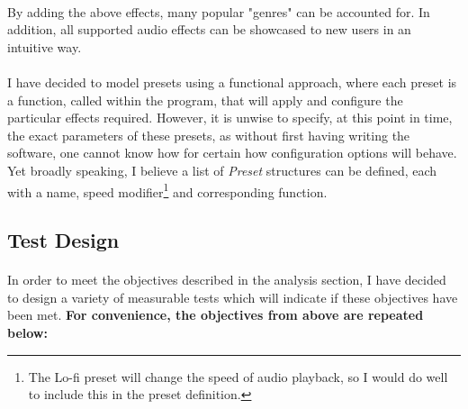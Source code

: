 \paragraph{}
By adding the above effects, many popular "genres" can be accounted for. In addition, all supported audio effects can be showcased to new users in an intuitive way.

\paragraph{}
I have decided to model presets using a functional approach, where each preset is a function, called within the program, that will apply and configure the particular effects required. However, it is unwise to specify, at this point in time, the exact parameters of these presets, as without first having writing the software, one cannot know how for certain how configuration options will behave. Yet broadly speaking, I believe a list of \textit{Preset} structures can be defined, each with a name, speed modifier\footnote{
	The Lo-fi preset will change the speed of audio playback, so I would do well to include this in the preset definition.
} and corresponding function.

\pagebreak
\subsection{Test Design}
\paragraph{}
In order to meet the objectives described in the analysis section, I have decided to design a variety of measurable tests which will indicate if these objectives have been met.
\textbf{For convenience, the objectives from above are repeated below:}

